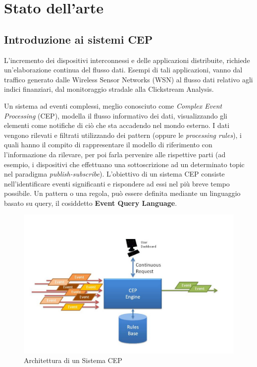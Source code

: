 \documentclass[11pt]{article}
\begin{document}
\section{Stato dell'arte}

\subsection{Introduzione ai sistemi CEP}
L'incremento dei dispositivi interconnessi e delle applicazioni distribuite, richiede un'elaborazione continua del flusso dati. Esempi di tali applicazioni, vanno dal traffico generato dalle Wireless Sensor Networks (WSN) al flusso dati relativo agli indici finanziari, dal monitoraggio stradale alla Clickstream Analysis. 

Un sistema ad eventi complessi, meglio conosciuto come \textit{Complex Event Processing} (CEP), modella il flusso informativo dei dati, visualizzando gli elementi come notifiche di ciò che sta accadendo nel mondo esterno. I dati vengono rilevati e filtrati utilizzando dei pattern (oppure le \textit{processing rules}), i quali hanno il compito di rappresentare il modello di riferimento con l'informazione da rilevare, per poi farla pervenire alle rispettive parti (ad esempio, i dispositivi che effettuano una sottoscrizione ad un determinato topic nel paradigma \textit{publish-subscribe}). L'obiettivo di un sistema CEP consiste nell'identificare eventi significanti e rispondere ad essi nel più breve tempo possibile.
Un pattern o una regola, può essere definita mediante un linguaggio basato su query, il cosiddetto \textbf{Event Query
	Language}.
\begin{figure}[H]
	\centering
	\includegraphics[scale=0.50]{images/CEP2.jpg}
	\caption{Architettura di un Sistema CEP\cite{cepimage}}
	\label{archcep}
\end{figure}
\end{document}

